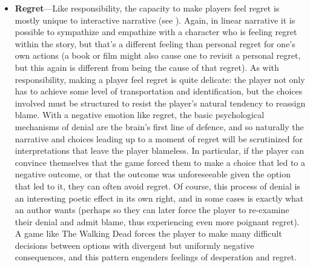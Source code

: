 \begin{itemize}
  \item \textbf{Regret}---Like responsibility, the capacity to make players feel regret is mostly unique to interactive narrative (see \citep{Frome2006,Zagal2009}).
%
Again, in linear narrative it is possible to sympathize and empathize with a character who is feeling regret within the story, but that's a different feeling than personal regret for one's own actions (a book or film might also cause one to revisit a personal regret, but this again is different from being the cause of that regret).
%
As with responsibility, making a player feel regret is quite delicate: the player not only has to achieve some level of transportation and identification, but the choices involved must be structured to resist the player's natural tendency to reassign blame.
%
With a negative emotion like regret, the basic psychological mechanisms of denial are the brain's first line of defence, and so naturally the narrative and choices leading up to a moment of regret will be scrutinized for interpretations that leave the player blameless.
%
In particular, if the player can convince themselves that the game forced them to make a choice that led to a negative outcome, or that the outcome was unforeseeable given the option that led to it, they can often avoid regret.
%
Of course, this process of denial is an interesting poetic effect in its own right, and in some cases is exactly what an author wants (perhaps so they can later force the player to re-examine their denial and admit blame, thus experiencing even more poignant regret).
%
A game like The Walking Dead \citep{TheWalkingDead} forces the player to make many difficult decisions between options with divergent but uniformly negative consequences, and this pattern engenders feelings of desperation and regret.

\end{itemize}


